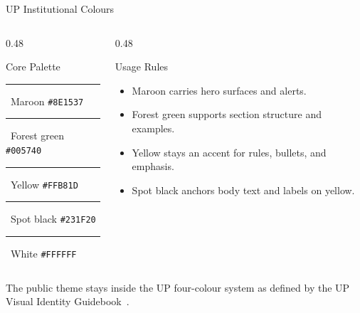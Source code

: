 \documentclass[aspectratio=169]{beamer}
\begin{document}
\begin{frame}{UP Institutional Colours}
  \begin{columns}[T]
    \begin{column}{0.48\textwidth}
      \begin{alertblock}{Core Palette}
        \textcolor{UPMaroon}{\rule{1em}{1em}}~Maroon \texttt{\#8E1537}\\[3pt]
        \textcolor{UPForestGreen}{\rule{1em}{1em}}~Forest green \texttt{\#005740}\\[3pt]
        \textcolor{UPYellow}{\rule{1em}{1em}}~Yellow \texttt{\#FFB81D}\\[3pt]
        \textcolor{UPBlack}{\rule{1em}{1em}}~Spot black \texttt{\#231F20}\\[3pt]
        \textcolor{white}{\rule{1em}{1em}}~White \texttt{\#FFFFFF}
      \end{alertblock}
    \end{column}
    \begin{column}{0.48\textwidth}
    \begin{exampleblock}{Usage Rules}
        \begin{itemize}
          \item Maroon carries hero surfaces and alerts.
          \item Forest green supports section structure and examples.
          \item Yellow stays an accent for rules, bullets, and emphasis.
          \item Spot black anchors body text and labels on yellow.
        \end{itemize}
    \end{exampleblock}
    \end{column}
  \end{columns}

  \vskip 8pt
  The public theme stays inside the UP four-colour system as defined by the UP Visual Identity Guidebook~\cite{upvig2017}.
\end{frame}
\end{document}
